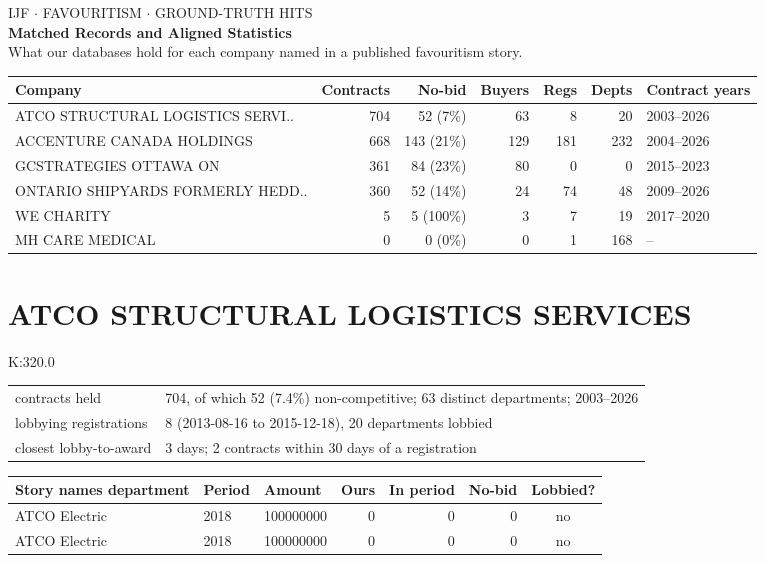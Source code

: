 \documentclass[10pt,a4paper]{article}
\newcommand{\lbl}[1]{{\color{slate}\ttfamily\scriptsize #1}}
\begin{document}
\begin{center}
{\color{slate}\ttfamily\scriptsize IJF $\cdot$ FAVOURITISM $\cdot$ GROUND-TRUTH HITS}\\[0.4em]
{\Large\bfseries Matched Records and Aligned Statistics}\\[0.35em]
{\color{slate}\small What our databases hold for each company named in a published
favouritism story.}
\end{center}
\vspace{0.3em}
\begin{center}\small
\begin{tabular}{@{}lrrrrrl@{}}
\toprule
\textbf{Company} & \textbf{Contracts} & \textbf{No-bid} & \textbf{Buyers} &
\textbf{Regs} & \textbf{Depts} & \textbf{Contract years}\\
\midrule
ATCO STRUCTURAL LOGISTICS SERVI.. & 704 & 52 (7\%) & 63 & 8 & 20 & 2003--2026\\
ACCENTURE CANADA HOLDINGS & 668 & 143 (21\%) & 129 & 181 & 232 & 2004--2026\\
GCSTRATEGIES OTTAWA ON & 361 & 84 (23\%) & 80 & 0 & 0 & 2015--2023\\
ONTARIO SHIPYARDS FORMERLY HEDD.. & 360 & 52 (14\%) & 24 & 74 & 48 & 2009--2026\\
WE CHARITY & 5 & 5 (100\%) & 3 & 7 & 19 & 2017--2020\\
MH CARE MEDICAL & 0 & 0 (0\%) & 0 & 1 & 168 & --\\
\bottomrule\end{tabular}\end{center}
\section*{ATCO STRUCTURAL LOGISTICS SERVICES}
\lbl{K:320.0}\par
{\small\begin{tabular}{@{}p{3.6cm}p{12.6cm}@{}}
contracts held & 704, of which 52 (7.4\%) non-competitive; 63 distinct departments; 2003--2026\\
lobbying registrations & 8 (2013-08-16 to 2015-12-18), 20 departments lobbied\\
closest lobby-to-award & 3 days; 2 contracts within 30 days of a registration\\
\end{tabular}}\par\vspace{0.35em}
{\small\begin{tabular}{@{}p{5.0cm}p{1.5cm}p{1.8cm}rrrc@{}}
\toprule
\textbf{Story names department} & \textbf{Period} & \textbf{Amount} & \textbf{Ours} & \textbf{In period} & \textbf{No-bid} & \textbf{Lobbied?}\\
\midrule
ATCO Electric & 2018 & 100000000 & 0 & 0 & 0 & no\\
ATCO Electric & 2018 & 100000000 & 0 & 0 & 0 & no\\
\bottomrule\end{tabular}}\par
\end{document}
